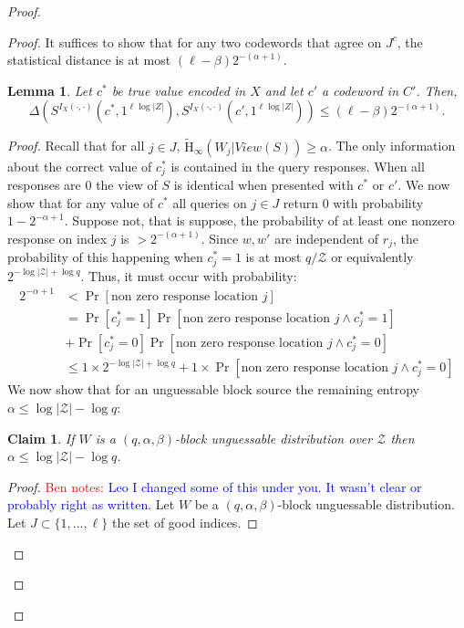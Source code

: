 \documentclass[11pt]{article}
\newcommand{\Hav}{\tilde{\mathrm{H}}_\infty}
\newtheorem{lemma}[theorem]{Lemma}
\newtheorem{claim}[theorem]{Claim}
\newcommand{\authnote}[2]{{\textcolor{red}{\textsf{#1 notes: }\textcolor{blue}{ #2}}\marginpar{\textcolor{red}{\textbf{!!!!!}}}}}
\newcommand{\authnote}[2]{}
\newcommand{\bnote}[1]{{\authnote{Ben}{#1}}}
\begin{document}
\begin{proof}
\begin{proof}
\noindent It suffices to show that for any two codewords that agree on $J^c$, the statistical distance is at most $(\ell-\beta)2^{-(\alpha+1)}$.
\begin{lemma}
\label{lem:codewords in I close}
Let $c^*$ be true value encoded in $X$ and let $c'$ a codeword in $C'$.  Then,
\[
\Delta( S^{I_X(\cdot, \cdot)}(c^*, 1^{\ell \log |Z|}), S^{I_X(\cdot, \cdot)}(c', 1^{\ell \log |Z|})) \le ( \ell -\beta) 2^{-(\alpha+1)}.
\]
\end{lemma}
\begin{proof}
Recall that for all $j\in J$, $\Hav(W_j | View(S))\geq \alpha$.  The only information about the correct value of $c_j^*$ is contained in the query responses.  When all responses are $0$ the view of $S$ is identical when presented with $c^*$ or $c'$.  We now show that for any value of $c^*$ all queries on $j \in J$ return $0$ with probability $1-2^{-\alpha+1}$.  Suppose not, that is suppose, the probability of at least one nonzero response on index $j$ is $> 2^{-(\alpha+1)}$.  Since $w, w'$ are independent of $r_j$, the probability of this happening when $c^*_j = 1$ is at most $q/\mathcal{Z}$ or  equivalently $2^{-\log |\mathcal{Z}|+\log q}$.  Thus, it must occur with probability:
\begin{align}
2^{-\alpha+1}&<\Pr[\text{non zero response location }j]\nonumber \\
 &= \Pr[c_j^* =1]\Pr[\text{non zero response location }j\wedge c_j^*=1]\nonumber \\&+ \Pr[c_j^*=0] \Pr[\text{non zero response location }j \wedge c_j^*=0]\nonumber \\
&\le 1\times 2^{-\log|\mathcal{Z}|+\log q} + 1\times  \Pr[\text{non zero response location }j \wedge c_j^*=0] \label{eq:ways to remove ent}
\end{align}
We now show that for an unguessable block source the remaining entropy $\alpha\leq \log |\mathcal{Z}|-\log q $:
\begin{claim}
\label{cl:ent bounded away from n}
If $W$ is a $(q, \alpha, \beta)$-block unguessable distribution over $\mathcal{Z}$ then $\alpha \le \log |\mathcal{Z}|-\log q$.
\end{claim}
\begin{proof}
\bnote{Leo I changed some of this under you.  It wasn't clear or probably right as written.}
Let $W$ be a $(q, \alpha, \beta)$-block unguessable distribution.  Let $J\subset\{1,..., \ell\}$ the set of good indices.

\end{proof}
\end{proof}
\end{proof}
\end{proof}
\end{document}
